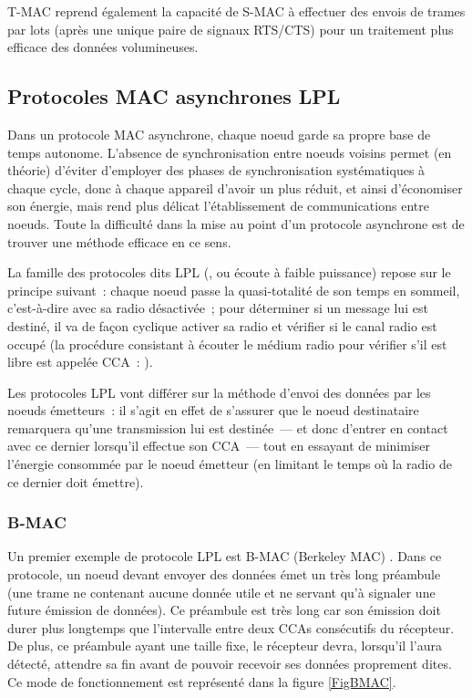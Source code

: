 T-MAC reprend également la capacité de S-MAC à effectuer des envois
de trames par lots (après une unique paire de signaux RTS/CTS) pour
un traitement plus efficace des données volumineuses.


\subsection{Protocoles MAC asynchrones LPL}
\label{SubsecProtoMACLPL}

Dans un protocole MAC asynchrone, chaque noeud garde sa propre base de temps
autonome. L'absence de synchronisation entre noeuds voisins permet (en
théorie) d'éviter d'employer des phases de synchronisation systématiques à
chaque cycle, donc à chaque appareil d'avoir un  plus
réduit, et ainsi d'économiser son énergie, mais rend plus délicat
l'établissement de communications entre noeuds. Toute la difficulté
dans la mise au point d'un protocole asynchrone est de trouver une méthode
efficace en ce sens.

La famille des protocoles dits LPL (, ou
écoute à faible puissance) repose sur le principe suivant~: chaque noeud
passe la quasi-totalité de son temps en sommeil, c'est-à-dire avec sa radio
désactivée~; pour déterminer si un message lui est destiné, il va de façon
cyclique activer sa radio et vérifier si le canal radio est occupé
(la procédure consistant à écouter le médium radio pour vérifier s'il est
libre est appelée CCA~: ).

Les protocoles LPL vont différer sur la méthode d'envoi des données par les
noeuds émetteurs~: il s'agit en effet de s'assurer que le noeud destinataire
remarquera qu'une transmission lui est destinée~--- et donc d'entrer en
contact avec ce dernier lorsqu'il effectue son CCA~--- tout en essayant
de minimiser l'énergie consommée par le noeud émetteur (en limitant le
temps où la radio de ce dernier doit émettre).

\subsubsection{B-MAC}
\label{ParBMAC}

Un premier exemple de protocole LPL est B-MAC (Berkeley MAC) \cite{BMAC}.
Dans ce protocole, un noeud devant envoyer des données émet un très long
préambule (une trame ne contenant aucune donnée utile et ne servant qu'à
signaler une future émission de données). Ce préambule est très long car
son émission doit durer plus longtemps que l'intervalle entre deux CCAs
consécutifs du récepteur. De plus, ce préambule ayant une taille fixe,
le récepteur devra, lorsqu'il l'aura détecté, attendre sa fin avant de
pouvoir recevoir ses données proprement dites. Ce mode de fonctionnement
est représenté dans la figure \vref{FigBMAC}.

